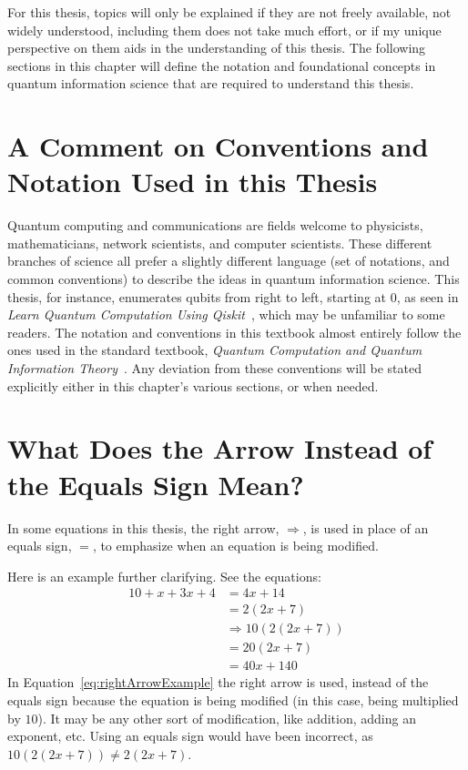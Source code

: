 For this thesis, topics will only be explained if they are not freely available, not widely understood, including them does not take much effort, or if my unique perspective on them aids in the understanding of this thesis. The following sections in this chapter will define the notation and foundational concepts in quantum information science that are required to understand this thesis.
\section{A Comment on Conventions and Notation Used in this Thesis}
Quantum computing and communications are fields welcome to physicists, mathematicians, network scientists, and computer scientists. These different branches of science all prefer a slightly different language (set of notations, and common conventions) to describe the ideas in quantum information science. This thesis, for instance, enumerates qubits from right to left, starting at 0, as seen in \emph{Learn Quantum Computation Using Qiskit}~\cite{Qiskit-Textbook}, which may be unfamiliar to some readers. The notation and conventions in this textbook almost entirely follow the ones used in the standard textbook, \emph{Quantum Computation and Quantum Information Theory}~\cite{nielsen2002quantum}. Any deviation from these conventions will be stated explicitly either in this chapter's various sections, or when needed.
\section{What Does the Arrow Instead of the Equals Sign Mean?}
\label{sec:whatDoesTheArrowInsteadOfEqualsSignMean}
In some equations in this thesis, the right arrow, $\Rightarrow$, is used in place of an equals sign, $=$, to emphasize when an equation is being modified.
\begin{example}
Here is an example further clarifying. See the equations:
\begin{align}
10 + x + 3x + 4 &= 4x + 14\\
&=2(2x + 7)\\
&\Rightarrow 10(2(2x + 7))\label{eq:rightArrowExample}\\
&= 20(2x + 7)\\
&=40x + 140
\end{align}
In Equation~\eqref{eq:rightArrowExample} the right arrow is used, instead of the equals sign because the equation is being modified (in this case, being multiplied by $10$). It may be any other sort of modification, like addition, adding an exponent, etc. Using an equals sign would have been incorrect, as $10(2(2x + 7)) \neq 2(2x + 7)$.
\end{example}
